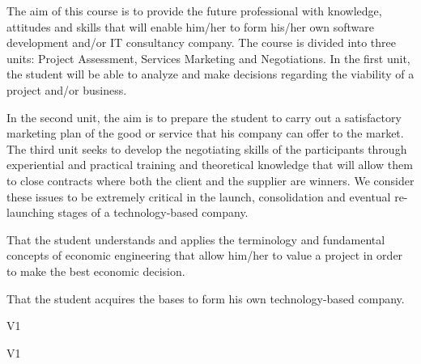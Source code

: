 \begin{syllabus}


\begin{justification}
   The aim of this course is to provide the future professional with knowledge, attitudes and skills that will enable him/her to form his/her own software development and/or IT consultancy company. The course is divided into three units: Project Assessment, Services Marketing and Negotiations. In the first unit, the student will be able to analyze and make decisions regarding the viability of a project and/or business.

   In the second unit, the aim is to prepare the student to carry out a satisfactory marketing plan of the good or service that his company can offer to the market. The third unit seeks to develop the negotiating skills of the participants through experiential and practical training and theoretical knowledge that will allow them to close contracts where both the client and the supplier are winners. We consider these issues to be extremely critical in the launch, consolidation and eventual re-launching stages of a technology-based company.
\end{justification}

\begin{goals}
\item That the student understands and applies the terminology and fundamental concepts of economic engineering that allow him/her to value a project in order to make the best economic decision.
\item That the student acquires the bases to form his own technology-based company.
\end{goals}

\begin{outcomes}{V1}
    \item {}
    \item {}
    \item {}
\end{outcomes}

\begin{specificoutcomes}{V1}
   \item {}
   \item {}
   \item {}
   \item {}
\end{specificoutcomes}


\end{syllabus}
